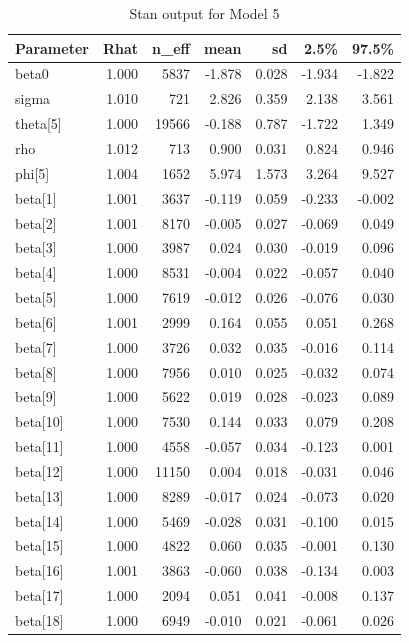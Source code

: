 \documentclass[
]{article}
\begin{document}
\begin{table}[H]
\centering
\begin{tabular}{lrrrrrr}
  \toprule
Parameter & Rhat & n\_eff & mean & sd & 2.5\% & 97.5\% \\ 
  \midrule
beta0 & 1.000 & 5837 & -1.878 & 0.028 & -1.934 & -1.822 \\ 
  sigma & 1.010 &  721 & 2.826 & 0.359 & 2.138 & 3.561 \\ 
  theta[5] & 1.000 & 19566 & -0.188 & 0.787 & -1.722 & 1.349 \\ 
  rho & 1.012 &  713 & 0.900 & 0.031 & 0.824 & 0.946 \\ 
  phi[5] & 1.004 & 1652 & 5.974 & 1.573 & 3.264 & 9.527 \\ 
  beta[1] & 1.001 & 3637 & -0.119 & 0.059 & -0.233 & -0.002 \\ 
  beta[2] & 1.001 & 8170 & -0.005 & 0.027 & -0.069 & 0.049 \\ 
  beta[3] & 1.000 & 3987 & 0.024 & 0.030 & -0.019 & 0.096 \\ 
  beta[4] & 1.000 & 8531 & -0.004 & 0.022 & -0.057 & 0.040 \\ 
  beta[5] & 1.000 & 7619 & -0.012 & 0.026 & -0.076 & 0.030 \\ 
  beta[6] & 1.001 & 2999 & 0.164 & 0.055 & 0.051 & 0.268 \\ 
  beta[7] & 1.000 & 3726 & 0.032 & 0.035 & -0.016 & 0.114 \\ 
  beta[8] & 1.000 & 7956 & 0.010 & 0.025 & -0.032 & 0.074 \\ 
  beta[9] & 1.000 & 5622 & 0.019 & 0.028 & -0.023 & 0.089 \\ 
  beta[10] & 1.000 & 7530 & 0.144 & 0.033 & 0.079 & 0.208 \\ 
  beta[11] & 1.000 & 4558 & -0.057 & 0.034 & -0.123 & 0.001 \\ 
  beta[12] & 1.000 & 11150 & 0.004 & 0.018 & -0.031 & 0.046 \\ 
  beta[13] & 1.000 & 8289 & -0.017 & 0.024 & -0.073 & 0.020 \\ 
  beta[14] & 1.000 & 5469 & -0.028 & 0.031 & -0.100 & 0.015 \\ 
  beta[15] & 1.000 & 4822 & 0.060 & 0.035 & -0.001 & 0.130 \\ 
  beta[16] & 1.001 & 3863 & -0.060 & 0.038 & -0.134 & 0.003 \\ 
  beta[17] & 1.000 & 2094 & 0.051 & 0.041 & -0.008 & 0.137 \\ 
  beta[18] & 1.000 & 6949 & -0.010 & 0.021 & -0.061 & 0.026 \\ 
   \bottomrule
\end{tabular}
\caption{Stan output for Model 5} 
\end{table}
\end{document}

